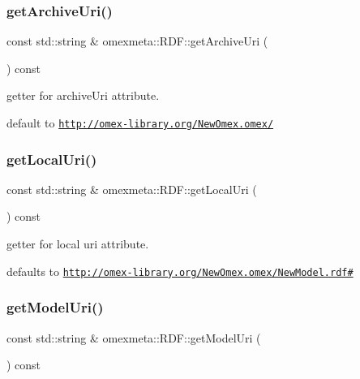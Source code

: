 \subsubsection{\texorpdfstring{get\+Archive\+Uri()}{getArchiveUri()}}
{\footnotesize\ttfamily const std\+::string \& omexmeta\+::\+R\+D\+F\+::get\+Archive\+Uri (\begin{DoxyParamCaption}{ }\end{DoxyParamCaption}) const}



getter for archive\+Uri attribute. 

default to \href{http://omex-library.org/NewOmex.omex/}{\tt http\+://omex-\/library.\+org/\+New\+Omex.\+omex/} \mbox{\label{classomexmeta_1_1RDF_a58b64a5972f74564994028504d8d227c}} 
\subsubsection{\texorpdfstring{get\+Local\+Uri()}{getLocalUri()}}
{\footnotesize\ttfamily const std\+::string \& omexmeta\+::\+R\+D\+F\+::get\+Local\+Uri (\begin{DoxyParamCaption}{ }\end{DoxyParamCaption}) const}



getter for local uri attribute. 

defaults to \href{http://omex-library.org/NewOmex.omex/NewModel.rdf#}{\tt http\+://omex-\/library.\+org/\+New\+Omex.\+omex/\+New\+Model.\+rdf\#} \mbox{\label{classomexmeta_1_1RDF_ac579ac8b79eb7d374a9077114837d2ef}} 
\subsubsection{\texorpdfstring{get\+Model\+Uri()}{getModelUri()}}
{\footnotesize\ttfamily const std\+::string \& omexmeta\+::\+R\+D\+F\+::get\+Model\+Uri (\begin{DoxyParamCaption}{ }\end{DoxyParamCaption}) const}



